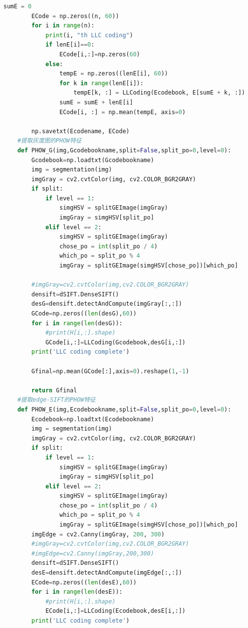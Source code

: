 \documentclass[supercite]{HustGraduPaper}
\begin{document}
\begin{sloppypar}
\begin{appendices}
\begin{spacing}{1.25}
\begin{lstlisting}[language=python]
        sumE = 0
        ECode = np.zeros((n, 60))
        for i in range(n):
            print(i, "th LLC coding")
            if lenE[i]==0:
                ECode[i,:]=np.zeros(60)
            else:
                tempE = np.zeros((lenE[i], 60))
                for k in range(lenE[i]):
                    tempE[k, :] = LLCoding(Ecodebook, E[sumE + k, :])
                sumE = sumE + lenE[i]
                ECode[i, :] = np.mean(tempE, axis=0)
    
        np.savetxt(Ecodename, ECode)
    #提取灰度图的PHOW特征
    def PHOW_G(img,Gcodebookname,split=False,split_po=0,level=0):
        Gcodebook=np.loadtxt(Gcodebookname)
        img = segmentation(img)
        imgGray = cv2.cvtColor(img, cv2.COLOR_BGR2GRAY)
        if split:
            if level == 1:
                simgHSV = splitGEImage(imgGray)
                imgGray = simgHSV[split_po]
            elif level == 2:
                simgHSV = splitGEImage(imgGray)
                chose_po = int(split_po / 4)
                which_po = split_po % 4
                imgGray = splitGEImage(simgHSV[chose_po])[which_po]
    
        #imgGray=cv2.cvtColor(img,cv2.COLOR_BGR2GRAY)
        densift=dSIFT.DenseSIFT()
        desG=densift.detectAndCompute(imgGray[:,:])
        GCode=np.zeros((len(desG),60))
        for i in range(len(desG)):
            #print(H[i,:].shape)
            GCode[i,:]=LLCoding(Gcodebook,desG[i,:])
        print('LLC coding complete')
    
        Gfinal=np.mean(GCode[:],axis=0).reshape(1,-1)
    
        return Gfinal
    #提取edge-SIFT的PHOW特征
    def PHOW_E(img,Ecodebookname,split=False,split_po=0,level=0):
        Ecodebook=np.loadtxt(Ecodebookname)
        img = segmentation(img)
        imgGray = cv2.cvtColor(img, cv2.COLOR_BGR2GRAY)
        if split:
            if level == 1:
                simgHSV = splitGEImage(imgGray)
                imgGray = simgHSV[split_po]
            elif level == 2:
                simgHSV = splitGEImage(imgGray)
                chose_po = int(split_po / 4)
                which_po = split_po % 4
                imgGray = splitGEImage(simgHSV[chose_po])[which_po]
        imgEdge = cv2.Canny(imgGray, 200, 300)
        #imgGray=cv2.cvtColor(img,cv2.COLOR_BGR2GRAY)
        #imgEdge=cv2.Canny(imgGray,200,300)
        densift=dSIFT.DenseSIFT()
        desE=densift.detectAndCompute(imgEdge[:,:])
        ECode=np.zeros((len(desE),60))
        for i in range(len(desE)):
            #print(H[i,:].shape)
            ECode[i,:]=LLCoding(Ecodebook,desE[i,:])
        print('LLC coding complete')
    

\end{lstlisting}
\end{spacing}
\end{appendices}
\end{sloppypar}
\end{document}
